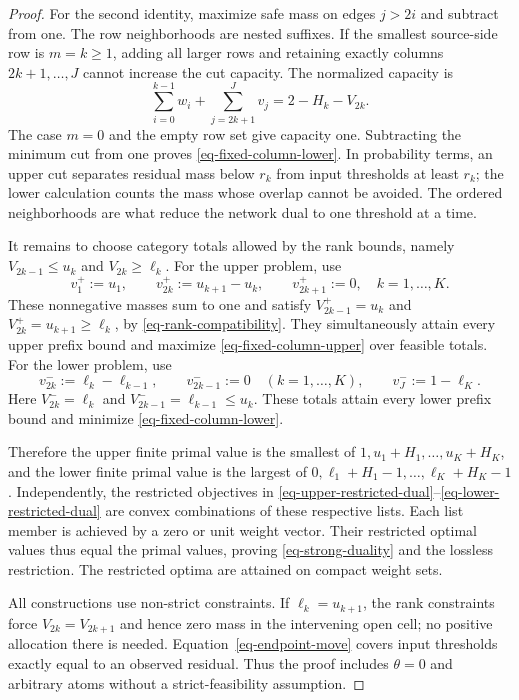 \begin{proof}
  For the second identity, maximize safe mass on edges $j>2i$ and subtract from one. The row neighborhoods are nested suffixes. If the smallest source-side row is $m=k\ge1$, adding all larger rows and retaining exactly columns $2k+1,\ldots,J$ cannot increase the cut capacity. The normalized capacity is
  \[
    \sum_{i=0}^{k-1}w_i+\sum_{j=2k+1}^Jv_j=2-H_k-V_{2k}.
  \]
  The case $m=0$ and the empty row set give capacity one. Subtracting the minimum cut from one proves \eqref{eq-fixed-column-lower}. In probability terms, an upper cut separates residual mass below $r_k$ from input thresholds at least $r_k$; the lower calculation counts the mass whose overlap cannot be avoided. The ordered neighborhoods are what reduce the network dual to one threshold at a time.

  It remains to choose category totals allowed by the rank bounds, namely $V_{2k-1}\le u_k$ and $V_{2k}\ge\ell_k$. For the upper problem, use
  \begin{equation}
    v_1^+:=u_1,\qquad
    v_{2k}^+:=u_{k+1}-u_k,\qquad
    v_{2k+1}^+:=0,\quad k=1,\ldots,K.
    \label{eq-upper-column-allocation}
  \end{equation}
  These nonnegative masses sum to one and satisfy $V_{2k-1}^+=u_k$ and $V_{2k}^+=u_{k+1}\ge\ell_k$, by \eqref{eq-rank-compatibility}. They simultaneously attain every upper prefix bound and maximize \eqref{eq-fixed-column-upper} over feasible totals. For the lower problem, use
  \begin{equation}
    v_{2k}^-:=\ell_k-\ell_{k-1},\qquad
    v_{2k-1}^-:=0\quad(k=1,\ldots,K),\qquad
    v_J^-:=1-\ell_K.
    \label{eq-lower-column-allocation}
  \end{equation}
  Here $V_{2k}^-=\ell_k$ and $V_{2k-1}^-=\ell_{k-1}\le u_k$. These totals attain every lower prefix bound and minimize \eqref{eq-fixed-column-lower}.

  Therefore the upper finite primal value is the smallest of $1,u_1+H_1,\ldots,u_K+H_K$, and the lower finite primal value is the largest of $0,\ell_1+H_1-1,\ldots,\ell_K+H_K-1$. Independently, the restricted objectives in \eqref{eq-upper-restricted-dual}--\eqref{eq-lower-restricted-dual} are convex combinations of these respective lists. Each list member is achieved by a zero or unit weight vector. Their restricted optimal values thus equal the primal values, proving \eqref{eq-strong-duality} and the lossless restriction. The restricted optima are attained on compact weight sets.

  All constructions use non-strict constraints. If $\ell_k=u_{k+1}$, the rank constraints force $V_{2k}=V_{2k+1}$ and hence zero mass in the intervening open cell; no positive allocation there is needed. Equation~\eqref{eq-endpoint-move} covers input thresholds exactly equal to an observed residual. Thus the proof includes $\theta=0$ and arbitrary atoms without a strict-feasibility assumption.
\end{proof}

